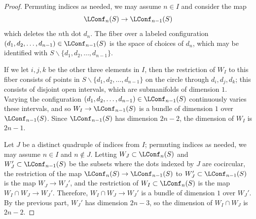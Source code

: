 \documentclass[11pt,oneside]{amsart}
\theoremstyle{definition}
\theoremstyle{remark}
\numberwithin{equation}{section}
\begin{document}
\begin{proof}
Permuting indices as needed, we may assume $n\in I$ and consider the map
\[
\LConf_n(S)\rightarrow \LConf_{n-1}(S)
\]
which deletes the $n$th dot $d_n$. The fiber over a labeled configuration $(d_1,d_2,\dotsc,d_{n-1})\in \LConf_{n-1}(S)$ is the space of choices of $d_n$, which may be identified with $S\smallsetminus \{d_1,d_2,\dotsc,d_{n-1}\}$.

If we let $i,j,k$ be the other three elements in $I$, then the restriction of $W_I$ to this fiber consists of points in $S\smallsetminus \{d_1,d_2,\dotsc,d_{n-1}\}$ on the circle through $d_i,d_j,d_k$; this consists of disjoint open intervals, which are submanifolds of dimension $1$. Varying the configuration $(d_1,d_2,\dotsc,d_{n-1})\in \LConf_{n-1}(S)$ continuously varies these intervals, and so
$
W_I\rightarrow \LConf_{n-1}(S)
$ is a bundle of dimension $1$ over $\LConf_{n-1}(S)$. Since $\LConf_{n-1}(S)$ has dimension $2n-2$, the dimension of $W_I$ is $2n-1$.

Let $J$ be a distinct quadruple of indices from $I$; permuting indices as needed, we may assume $n\in I$ and $n\not\in J$. Letting $W_J\subset \LConf_n(S)$ and $W_J'\subset \LConf_{n-1}(S)$ be the subsets where the dots indexed by $J$ are cocircular, the restriction of the map $\LConf_n(S)\rightarrow \LConf_{n-1}(S)$ to $W_J'\subset \LConf_{n-1}(S)$ is the map $W_J\rightarrow W_J'$, and the restriction of $W_I\subset \LConf_n(S)$ is the map $W_I\cap W_J\rightarrow W_J'$. Therefore, $W_I\cap W_J\rightarrow W_J'$ is a bundle of dimension $1$ over $W_J'$. By the previous part, $W_J'$ has dimension $2n-3$, so the dimension of $W_I\cap W_J$ is $2n-2$.
%
%
\end{proof}
\end{document}
